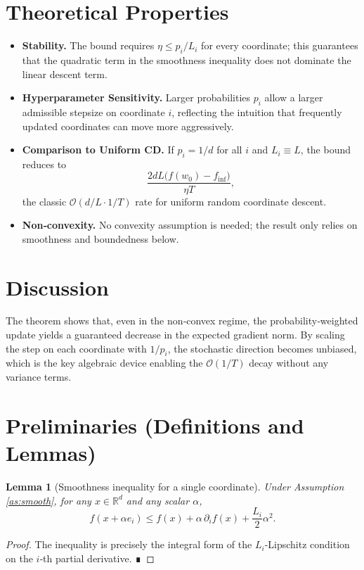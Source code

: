 \documentclass{article}
\newtheorem{lemma}{Lemma}
\newcommand{\R}{\mathbb{R}}
\begin{document}
\section*{Theoretical Properties}
\begin{itemize}
\item \textbf{Stability.} The bound requires $\eta\le p_i/L_i$ for every coordinate; this guarantees that the quadratic term in the smoothness inequality does not dominate the linear descent term.
\item \textbf{Hyperparameter Sensitivity.} Larger probabilities $p_i$ allow a larger admissible stepsize on coordinate $i$, reflecting the intuition that frequently updated coordinates can move more aggressively.
\item \textbf{Comparison to Uniform CD.} If $p_i=1/d$ for all $i$ and $L_i\equiv L$, the bound reduces to
\[
\frac{2dL\bigl(f(w_0)-f_{\inf}\bigr)}{\eta T},
\]
the classic $\mathcal O(d/L\cdot 1/T)$ rate for uniform random coordinate descent.
\item \textbf{Non‑convexity.} No convexity assumption is needed; the result only relies on smoothness and boundedness below.
\end{itemize}

\section*{Discussion}
The theorem shows that, even in the non‑convex regime, the probability‑weighted update yields a guaranteed decrease in the expected gradient norm. By scaling the step on each coordinate with $1/p_i$, the stochastic direction becomes unbiased, which is the key algebraic device enabling the $\mathcal O(1/T)$ decay without any variance terms.

\newpage
\section*{Preliminaries (Definitions and Lemmas)}
\begin{lemma}[Smoothness inequality for a single coordinate]\label{lem:smooth}
Under Assumption \ref{as:smooth}, for any $x\in\R^{d}$ and any scalar $\alpha$,
\[
f(x+\alpha e_i)\le f(x)+\alpha\,\partial_i f(x)+\frac{L_i}{2}\alpha^{2}.
\]
\end{lemma}
\begin{proof}
The inequality is precisely the integral form of the $L_i$‑Lipschitz condition on the $i$‑th partial derivative. ∎
\end{proof}
\end{document}
